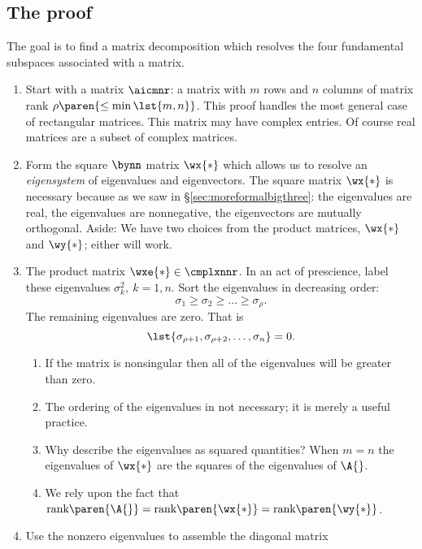 \subsection{The proof}
The goal is to find a matrix decomposition which resolves the four fundamental subspaces associated with a matrix.
\begin{enumerate}
\item Start with a matrix $\aicmnr$: a matrix with $m$ rows and $n$ columns of matrix rank $\rho\paren{\le \min\lst{m,n}}$. 
\subitem This proof handles the most general case of rectangular matrices. 
\subitem This matrix may have complex entries. 
\subitem Of course real matrices are a subset of complex matrices.
\item Form the square $\bynn$ matrix $\wx{*}$ which allows us to resolve an \emph{eigensystem} of eigenvalues and eigenvectors. The square matrix $\wx{*}$ is necessary because as we saw in \S\eqref{sec:moreformalbigthree}:
\subitem the eigenvalues are real,
\subitem the eigenvalues are nonnegative,
\subitem the eigenvectors are mutually orthogonal.
\subitem Aside: We have two choices from the product matrices, $\wx{*}$ and $\wy{*}$; either will work.
\item The product matrix $\wxe{*}\in\cmplxnnr$. In an act of prescience, label these eigenvalues $\sigma_{k}^{2},\ k=1,n$. Sort the eigenvalues in decreasing order:
\begin{equation}
  \sigma_{1} \ge \sigma_{2} \ge \dots \ge \sigma_{\rho}.
\end{equation}
\subitem The remaining eigenvalues are zero. That is
\begin{equation}
  \lst{ \sigma_{\rho+1}, \sigma_{\rho+2}, \dots, \sigma_{n} } = 0.
\end{equation}
%
\begin{enumerate}
\item If the matrix is nonsingular then all of the eigenvalues will be greater than zero.
\item The ordering of the eigenvalues in not necessary; it is merely a useful practice.
\item Why describe the eigenvalues as squared quantities? When $m=n$ the eigenvalues of $\wx{*}$ are the squares of the eigenvalues of $\A{}$.
\item We rely upon the fact that $\text{rank}\paren{\A{}} = \text{rank}\paren{\wx{*}} = \text{rank}\paren{\wy{*}}$.
\end{enumerate}
\item Use the nonzero eigenvalues to assemble the diagonal matrix

\end{enumerate}
